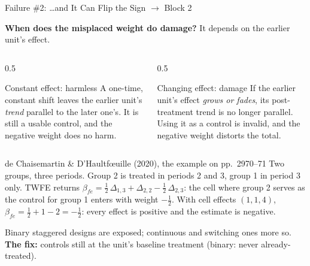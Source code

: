 \documentclass[main.tex]{subfiles}
\begin{document}
\begin{frame}{Failure \#2: \ldots and It Can Flip the Sign \hfill {\small$\rightarrow$ Block 2}}

  \textbf{When does the misplaced weight do damage?} It depends on the
  earlier unit's effect.

  \medskip
  \begin{columns}[T]
    \begin{column}{0.5\textwidth}
      \begin{block}{Constant effect: harmless}
        A one-time, constant shift leaves the earlier unit's \emph{trend} parallel
        to the later one's. It is still a usable control, and the negative weight
        does no harm.
      \end{block}
    \end{column}
    \begin{column}{0.5\textwidth}
      \begin{alertblock}{Changing effect: damage}
        If the earlier unit's effect \emph{grows or fades}, its post-treatment trend
        is \alert{no longer parallel}. Using it as a control is invalid, and the
        negative weight distorts the total.
      \end{alertblock}
    \end{column}
  \end{columns}

  \medskip
  \begin{block}{de Chaisemartin \& D'Haultf\oe{}uille (2020), the example on pp.~2970--71}
    \small
    Two groups, three periods. Group 2 is treated in periods 2 and 3, group 1
    in period 3 only. TWFE returns
    $\beta_{fe} = \tfrac12\,\Delta_{1,3} + \Delta_{2,2} - \tfrac12\,\Delta_{2,3}$:
    the cell where group 2 serves as the control for group 1 enters with weight
    $-\tfrac12$. With cell effects $(1, 1, 4)$,
    $\beta_{fe} = \tfrac12 + 1 - 2 = -\tfrac12$:
    \alert{every effect is positive and the estimate is negative.}
  \end{block}

  \medskip
  Binary staggered designs are exposed; continuous and switching ones more so.
  \textbf{The fix:} controls still at the unit's baseline treatment (binary:
  never already-treated).

\end{frame}
\end{document}

